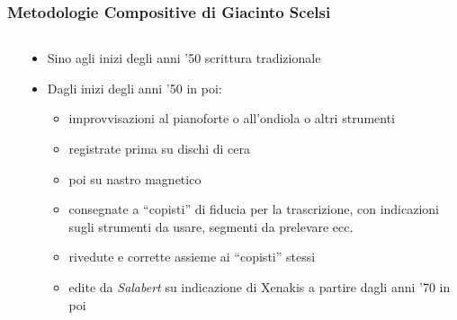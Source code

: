 \documentclass[compress,xcolor=dvipsnames]{beamer}
\newcommand{\Scelsi}{Giacinto Scelsi\xspace}
\begin{document}
\begin{frame}
	\frametitle[Metodologie Compositive]{Metodologie Compositive di \Scelsi}

 	\begin{columns}[T]
      \begin{column}{0.3\textwidth}
          \begin{center}
 		      \end{center}
 	  \end{column}
    \begin{column}{0.65\textwidth}
				\begin{itemize}%
		
	        \item Sino agli inizi degli anni '50 scrittura tradizionale
	
	        \item Dagli inizi degli anni '50 in poi:
	
	            \begin{itemize}%

	                \item  improvvisazioni al pianoforte o all'ondiola o altri
	                    strumenti
	                \item registrate prima su dischi di cera
	                \item poi su nastro magnetico
	                \item consegnate a ``copisti'' di fiducia per la
	                    trascrizione, \onslide<+- | alert@+->
	                    con indicazioni sugli strumenti da usare, segmenti da
	                    prelevare ecc.
	                \item rivedute e corrette assieme ai ``copisti'' stessi
	                \item edite da \emph{Salabert} su indicazione di Xenakis a
	                    partire dagli anni '70 in poi

	            \end{itemize}
				\end{itemize}
		\end{column}
  \end{columns}

\end{frame}
\end{document}
